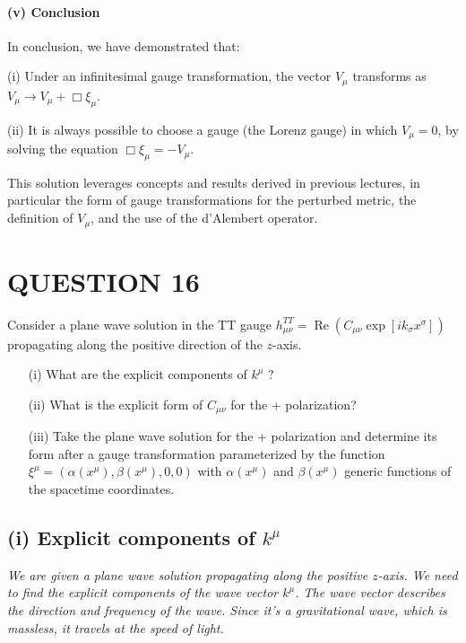 \paragraph{(v) Conclusion}

In conclusion, we have demonstrated that:

(i) Under an infinitesimal gauge transformation, the vector $V_{\mu}$ transforms as $V_{\mu} \to V_{\mu} + \Box \xi_{\mu}$.

(ii) It is always possible to choose a gauge (the Lorenz gauge) in which $V_{\mu} = 0$, by solving the equation $\Box \xi_{\mu} = -V_{\mu}$.

This solution leverages concepts and results derived in previous lectures, in particular the form of gauge transformations for the perturbed metric, the definition of $V_{\mu}$, and the use of the d'Alembert operator.

\pagebreak

\section*{QUESTION 16}
Consider a plane wave solution in the TT gauge $h_{\mu \nu}^{T T}=\operatorname{Re}\left(C_{\mu \nu} \exp \left[i k_{\sigma} x^{\sigma}\right]\right)$ propagating along the positive direction of the $z$-axis.
\begin{itemize}
    \item[(i)] What are the explicit components of $k^{\mu}$ ?
    \item[(ii)] What is the explicit form of $C_{\mu \nu}$ for the + polarization?
    \item[(iii)] Take the plane wave solution for the + polarization and determine its form after a gauge transformation parameterized by the function $\xi^{\mu}=\left(\alpha\left(x^{\mu}\right), \beta\left(x^{\mu}\right), 0,0\right)$ with $\alpha\left(x^{\mu}\right)$ and $\beta\left(x^{\mu}\right)$ generic functions of the spacetime coordinates.
\end{itemize}

\subsection*{(i) Explicit components of $k^{\mu}$}

\emph{We are given a plane wave solution propagating along the positive $z$-axis. We need to find the explicit components of the wave vector $k^{\mu}$. The wave vector describes the direction and frequency of the wave. Since it's a gravitational wave, which is massless, it travels at the speed of light.}

